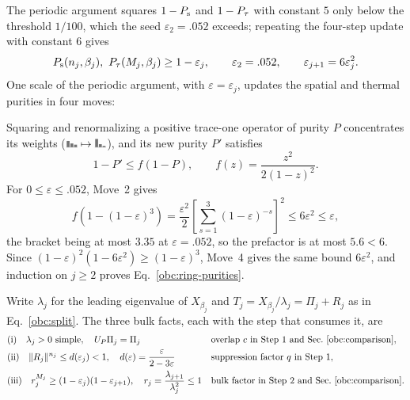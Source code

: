 The periodic argument squares $1-P_{\mathrm s}$ and $1-P_{\tau}$ with constant $5$ only
below the threshold $1/100$, which the seed $\varepsilon_2=.052$
exceeds; repeating the four-step update with constant $6$ gives
\begin{equation}
    \Ps(n_j,\beta_j),\ \Pt(M_j,\beta_j)\ge1-\varepsilon_j,\qquad
    \varepsilon_2=.052,\qquad
    \varepsilon_{j+1}=6\varepsilon_j^2.
    \label{obc:ring-purities}
\end{equation}
One scale of the periodic argument, with $\varepsilon=\varepsilon_j$,
updates the spatial and thermal purities in four moves:
\begin{proofdiagram}
    \ringsteps
\end{proofdiagram}
Squaring and renormalizing a positive
trace-one operator of purity $P$ concentrates its weights
($\specbars[black!55]{.5,.3,.2}\mapsto\specbars[black!55]{.66,.24,.1}$),
and its new purity $P'$ satisfies
\begin{equation}
    1-P'\le f(1-P),\qquad
    f(z)=\frac{z^2}{2(1-z)^2}.
    \label{obc:square}
\end{equation}
For $0\le\varepsilon\le.052$, Move~2 gives
\begin{equation}
    f(1-(1-\varepsilon)^3)
    =\frac{\varepsilon^2}{2}
    \left[\sum_{s=1}^3(1-\varepsilon)^{-s}\right]^2
    \le6\varepsilon^2\le\varepsilon,
    \label{obc:six}
\end{equation}
the bracket being at most $3.35$ at $\varepsilon=.052$, so the prefactor is
at most $5.6<6$. Since
$(1-\varepsilon)^2(1-6\varepsilon^2)\ge(1-\varepsilon)^3$, Move~4
gives the same bound $6\varepsilon^2$, and induction on $j\ge2$ proves
Eq.~\eqref{obc:ring-purities}.

Write $\lambda_j$ for the leading eigenvalue of $X_{\beta_j}$ and
$T_j=X_{\beta_j}/\lambda_j=\Pi_j+R_j$ as in Eq.~\eqref{obc:split}. The
three bulk facts, each with the step that consumes it, are%
~
\begin{align}
     &\text{(i)}\quad \lambda_j>0\text{ simple},\quad U_P\Pi_j=\Pi_j
     &                                                                           &\text{overlap $c$ in Step~1 and Sec.~\ref{obc:comparison}},\notag\\
     &\text{(ii)}\quad \|R_j\|^{n_j}\le d(\varepsilon_j)<1,\quad
    d(\varepsilon)=\frac{\varepsilon}{2-3\varepsilon}
     &                                                                           &\text{suppression factor $q$ in Step~1},\notag\\
     &\text{(iii)}\quad r_j^{M_j}\ge(1-\varepsilon_j)(1-\varepsilon_{j+1}),\quad
    r_j=\frac{\lambda_{j+1}}{\lambda_j^2}\le1
     &                                                                           &\text{bulk factor in Step~2 and Sec.~\ref{obc:comparison}}.
    \label{obc:ring-bounds}
\end{align}

